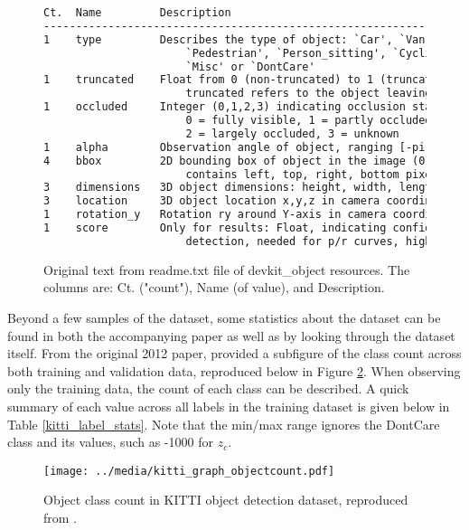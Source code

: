 \begin{figure}[ht] %
	\small
	\begin{lstlisting}[language=tex]
Ct.  Name         Description
----------------------------------------------------------------------------
1    type         Describes the type of object: `Car', `Van', `Truck',
                      `Pedestrian', `Person_sitting', `Cyclist', `Tram',
                      `Misc' or `DontCare'
1    truncated    Float from 0 (non-truncated) to 1 (truncated), where
                      truncated refers to the object leaving image boundaries
1    occluded     Integer (0,1,2,3) indicating occlusion state:
                      0 = fully visible, 1 = partly occluded
                      2 = largely occluded, 3 = unknown
1    alpha        Observation angle of object, ranging [-pi..pi]
4    bbox         2D bounding box of object in the image (0-based index):
                      contains left, top, right, bottom pixel coordinates
3    dimensions   3D object dimensions: height, width, length (in meters)
3    location     3D object location x,y,z in camera coordinates (in meters)
1    rotation_y   Rotation ry around Y-axis in camera coordinates [-pi..pi]
1    score        Only for results: Float, indicating confidence in
                      detection, needed for p/r curves, higher is better.
	\end{lstlisting}
	\onehalfspacing %
	\caption{Original text from readme.txt file of devkit\_object resources. The columns are: Ct. ("count"), Name (of value), and Description.}
	\label{kitti_devkit_info} %
\end{figure}

Beyond a few samples of the dataset, some statistics about the dataset can be found in both the accompanying paper as well as by looking through the dataset itself. From the original 2012 paper, \cite{geiger_are_2012} provided a subfigure of the class count across both training and validation data, reproduced below in Figure \ref{kitti_graph_objectcount}. When observing only the training data, the count of each class can be described. A quick summary of each value across all labels in the training dataset is given below in Table \ref{kitti_label_stats}. Note that the min/max range ignores the DontCare class and its values, such as -1000 for $z_c$.

\begin{figure}[H]
	\centering
	\texttt{[image: ../media/kitti\_graph\_objectcount.pdf]}
	\caption{Object class count in KITTI object detection dataset, reproduced from \cite{geiger_are_2012}.}
	\label{kitti_graph_objectcount}
\end{figure}

